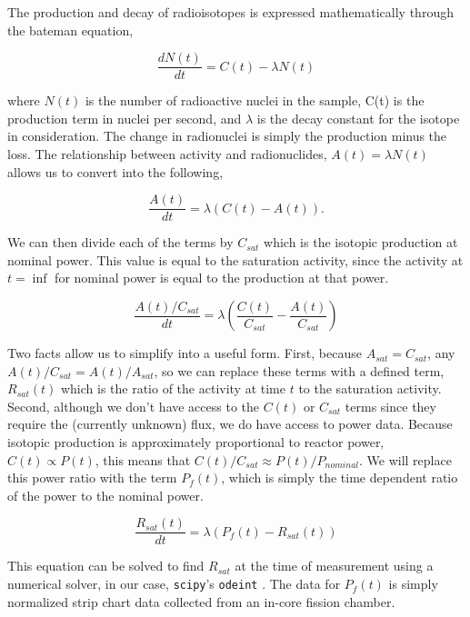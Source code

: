 The production and decay of radioisotopes is expressed mathematically through the bateman equation,

\begin{equation}
\label{eqn:bateman}
\frac{dN(t)}{dt} = C(t) - \lambda N(t)
\end{equation}

where $N(t)$ is the number of radioactive nuclei in the sample, C(t) is the production term in nuclei per second, and $\lambda$ is the decay constant for the isotope in consideration.
The change in radionuclei is simply the production minus the loss.
The relationship between activity and radionuclides, $A(t) = \lambda N(t)$ allows us to convert  into the following,

\begin{equation}
\label{eqn:bateman_activity}
\frac{A(t)}{dt} = \lambda (C(t) - A(t)).
\end{equation}

We can then divide each of the terms by $C_{sat}$ which is the isotopic production at nominal power.
This value is equal to the saturation activity, since the activity at $t = \inf$ for nominal power is equal to the production at that power.

\begin{equation}
\label{eqn:bateman_ratios}
\frac{A(t) / C_{sat}}{dt} = \lambda (\frac{C(t)}{C_{sat}} - \frac{A(t)}{C_{sat}})
\end{equation}

Two facts allow us to simplify  into a useful form.
First, because $A_{sat} = C_{sat}$, any $A(t) / C_{sat} = A(t) / A_{sat}$, so we can replace these terms with a defined term, $R_{sat}(t)$ which is the ratio of the activity at time $t$ to the saturation activity.
Second, although we don't have access to the $C(t)$ or $C_{sat}$ terms since they require the (currently unknown) flux, we do have access to power data.
Because isotopic production is approximately proportional to reactor power, $C(t) \propto P(t)$, this means that $C(t) / C_{sat} \approx P(t) / P_{nominal}$.
We will replace this power ratio with the term $P_{f}(t)$, which is simply the time dependent ratio of the power to the nominal power.

\begin{equation}
\label{eqn:bateman_r_sat}
\frac{R_{sat}(t)}{dt} = \lambda (P_{f}(t) - R_{sat}(t))
\end{equation}

This equation can be solved to find $R_{sat}$ at the time of measurement using a numerical solver, in our case, {\tt scipy}'s {\tt odeint} \cite{jones2001scipy}.
The data for $P_{f}(t)$ is simply normalized strip chart data collected from an in-core fission chamber.



